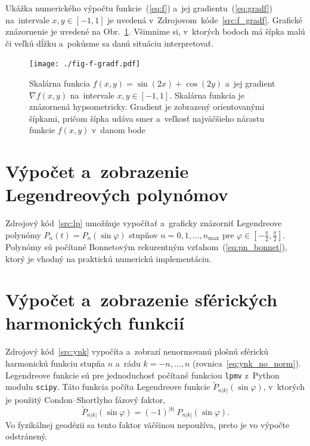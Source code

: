 \documentclass[a4paper, 12pt]{book}
\begin{document}
Ukážka numerického výpočtu funkcie~(\ref{eq:f}) a~jej
gradientu~(\ref{eq:gradf}) na~intervale $x, y \in [-1, 1]$ je uvedená
v~Zdrojovom~kóde~\ref{src:f_gradf}.  Grafické znázornenie je uvedené na
Obr.~\ref{fig:f_gradf}.  Všimnime si, v~ktorých bodoch má šípka malú či veľkú
dĺžku a~pokúsme sa danú situáciu interpretovať.



\begin{figure}[bt]
\centering
\texttt{[image: ./fig-f-gradf.pdf]}
\caption{Skalárna funkcia $f(x, y) = \sin(2x) + \cos(2y)$ a~jej gradient
$\nabla f(x, y)$ na~intervale $x, y \in [-1, 1]$.  Skalárna funkcia je
znázornená hypsometricky.  Gradient je zobrazený orientovanými šípkami, pričom
šípka udáva smer a~veľkosť najväčšieho nárastu funkcie $f(x, y)$ v~danom bode}
\label{fig:f_gradf}
\end{figure}




\chapter{Výpočet a~zobrazenie Legendreových polynómov}
\label{app:lp}

Zdrojový kód~\ref{src:lp} umožňuje vypočítať a~graficky znázorniť Legendreove
polynómy $P_n(t) = P_n(\sin\varphi)$ stupňov $n = 0, 1, \dots, n_{\max}$ pre
$\varphi \in [-\frac{\pi}{2}, \frac{\pi}{2}]$.  Polynómy sú počítané Bonnetovým
rekurentným vzťahom~(\ref{eq:pn_bonnet}), ktorý je vhodný na praktickú
numerickú implementáciu.







\chapter{Výpočet a~zobrazenie sférických harmonických funkcií}
\label{app:sh}

Zdrojový kód~\ref{src:ynk} vypočíta a~zobrazí nenormovanú plošnú sférickú
harmonickú funkciu stupňa $n$ a~rádu $k = -n, \dots, n$
(rovnica~\ref{eq:ynk_no_norm}).  Legendreove funkcie sú pre jednoduchosť
počítané funkciou \texttt{lpmv} z~Python modulu \texttt{scipy}.  Táto funkcia
počíta Legendreove funkcie $\tilde{P}_{n|k|}(\sin\varphi)$, v~ktorých je
použitý Condon--Shortlyho fázový faktor,
%
\begin{equation}
\tilde{P}_{n|k|}(\sin\varphi) = (-1)^{|k|} \, P_{n|k|}(\sin\varphi){.}
\end{equation}
%
Vo fyzikálnej geodézii sa tento faktor väčšinou nepoužíva, preto je vo výpočte
odstránený.
\end{document}
